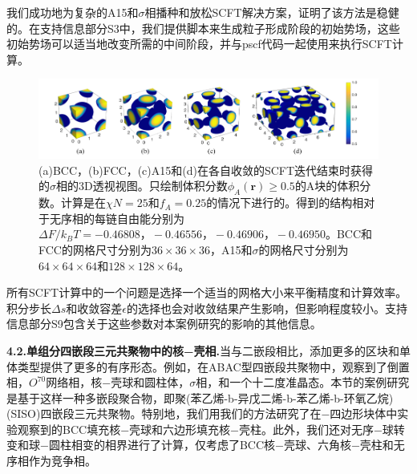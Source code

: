\documentclass[12pt，a4paper]{article}
\numberwithin{equation}{section}
\begin{document}
我们成功地为复杂的A15和$\sigma$相播种和放松SCFT解决方案，证明了该方法是稳健的。在支持信息部分S3中，我们提供脚本来生成粒子形成阶段的初始势场，这些初始势场可以适当地改变所需的中间阶段，并与pscf代码一起使用来执行SCFT计算。

\begin{figure}[H]
\centering
\includegraphics[scale=0.5]{./figures/6.png}
\caption{(a)BCC，(b)FCC，(c)A15和(d)在各自收敛的SCFT迭代结束时获得的$\sigma$相的3D透视视图。只绘制体积分数$\phi _A(\mathbf{r})\geq 0.5$的A块的体积分数。计算是在$\chi N=25$和$f_A=0.25$的情况下进行的。得到的结构相对于无序相的每链自由能分别为$\Delta F/k_BT=−0.46808，−0.46556，−0.46906，−0.46950$。BCC和FCC的网格尺寸分别为$36\times 36\times 36$，A15和$\sigma$的网格尺寸分别为$64\times 64\times 64$和$128\times 128 \times 64$。}
\label{图6}
\end{figure}

所有SCFT计算中的一个问题是选择一个适当的网格大小来平衡精度和计算效率。积分步长$\Delta s$和收敛容差$\epsilon$的选择也会对收敛结果产生影响，但影响程度较小。支持信息部分S9包含关于这些参数对本案例研究的影响的其他信息。

\textbf{4.2.单组分四嵌段三元共聚物中的核−壳相.}当与二嵌段相比，添加更多的区块和单体类型提供了更多的有序形态。例如，在ABAC型四嵌段共聚物中，观察到了倒置相，$O^{70}$网络相，核−壳球和圆柱体，$\sigma$相，和一个十二度准晶态。本节的案例研究是基于这样一种多嵌段聚合物，即聚(苯乙烯-b-异戊二烯-b-苯乙烯-b-环氧乙烷)(SISO)四嵌段三元共聚物。特别地，我们用我们的方法研究了在−四边形块体中实验观察到的BCC填充核−壳球和六边形填充核−壳柱。此外，我们还对无序−球转变和球−圆柱相变的相界进行了计算，仅考虑了BCC核−壳球、六角核−壳柱和无序相作为竞争相。
\end{document}
